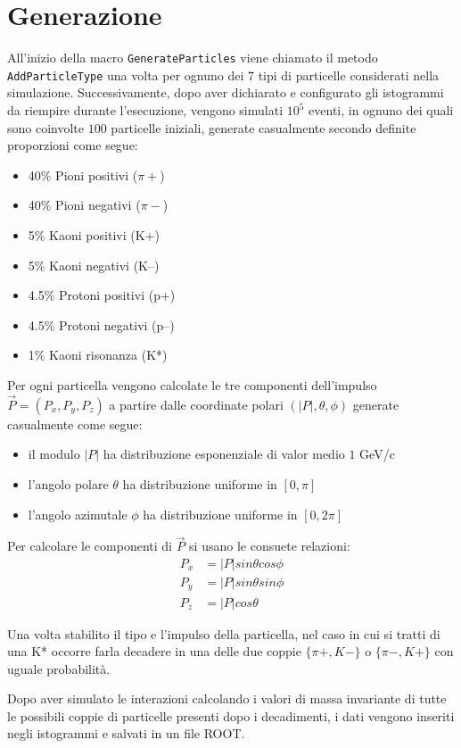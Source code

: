 \documentclass{article}
\begin{document}
\section{Generazione}
All'inizio della macro \texttt{GenerateParticles} viene chiamato il metodo \texttt{AddParticleType} una volta per ognuno dei 7 tipi di particelle considerati nella simulazione. Successivamente, dopo aver dichiarato e configurato gli istogrammi da riempire durante l'esecuzione, vengono simulati $10^5$ eventi, in ognuno dei quali sono coinvolte $100$ particelle iniziali, generate casualmente secondo definite proporzioni come segue:
\begin{itemize}
    \item 40\% Pioni positivi ($\pi+$)
    \item 40\% Pioni negativi ($\pi-$)
    \item 5\% Kaoni positivi (K+)
    \item 5\% Kaoni negativi (K--)
    \item 4.5\% Protoni positivi (p+)
    \item 4.5\% Protoni negativi (p--)
    \item 1\% Kaoni risonanza (K*)
\end{itemize}
Per ogni particella vengono calcolate le tre componenti dell'impulso $\overrightarrow{P}=(P_x, P_y, P_z)$ a partire dalle coordinate polari $(|P|, \theta, \phi)$ generate casualmente come segue:
\begin{itemize}
    \item il modulo $|P|$ ha distribuzione esponenziale di valor medio $1$ GeV/c
    \item l'angolo polare $\theta$ ha distribuzione uniforme in $[0, \pi]$
    \item l'angolo azimutale $\phi$ ha distribuzione uniforme in $[0, 2\pi]$
\end{itemize}
Per calcolare le componenti di $\overrightarrow{P}$ si usano le consuete relazioni:
\begin{align*}
    P_x &= |P| sin \theta cos \phi \\
    P_y &= |P| sin \theta sin \phi \\
    P_z &= |P| cos \theta
\end{align*}

Una volta stabilito il tipo e l'impulso della particella, nel caso in cui si tratti di una K* occorre farla decadere in una delle due coppie $\{\pi+, K-\}$ o $\{\pi-, K+\}$ con uguale probabilità.

Dopo aver simulato le interazioni calcolando i valori di massa invariante di tutte le possibili coppie di particelle presenti dopo i decadimenti, i dati vengono inseriti negli istogrammi e salvati in un file ROOT.
\end{document}
